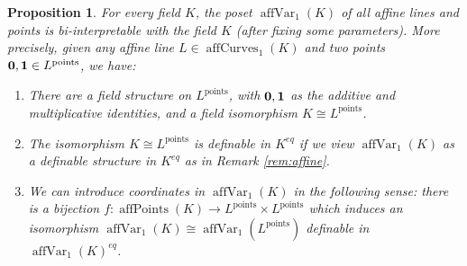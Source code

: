 \documentclass{amsart}
\theoremstyle{plain}
\newtheorem{prop}[thm]{Proposition}
\theoremstyle{definition}
\newcommand{\pt}[1]{{#1}^{\text{points}}}
\newcommand{\affPoints}[1]{\operatorname{affPoints} (#1)}
\newcommand{\naffCurves}[2]{\operatorname{affCurves}_{#2}(#1)}
\newcommand{\naffVar}[2]{\operatorname{affVar}_{#2}(#1)}
\begin{document}
\begin{prop}\label{prop:field-interpretation}
	For every field $K$, the poset $\naffVar K 1$ of all affine lines and points is bi-interpretable with the field $K$ (after fixing some parameters). More precisely, given any affine line $L\in \naffCurves K 1$ and two points ${\bf 0}, {\bf 1}\in L^{\text{points}}$, we have: 
	
	\begin{enumerate}
	\item There are a field structure on $L^{\text{points}}$, with $\bf 0, \bf 1$ as the additive and multiplicative identities, and a field isomorphism $K\cong L^{\text{points}}$. 
	\item 
	The isomorphism $K\cong L^{\text{points}}$ is definable in $K^{eq}$ if we view $\naffVar K 1$ as a definable structure in $K^{eq}$ as in Remark \ref{rem:affine}. 
	\item 
	We can introduce coordinates in $\naffVar K 1$ in the following sense: there is a bijection $f: \affPoints K \to \pt L \times \pt L$ which induces an isomorphism $\naffVar K 1 \cong \naffVar {\pt L} 1$ definable in ${\naffVar K 1}^{eq}$. 
\end{enumerate}
\end{prop}
\end{document}
